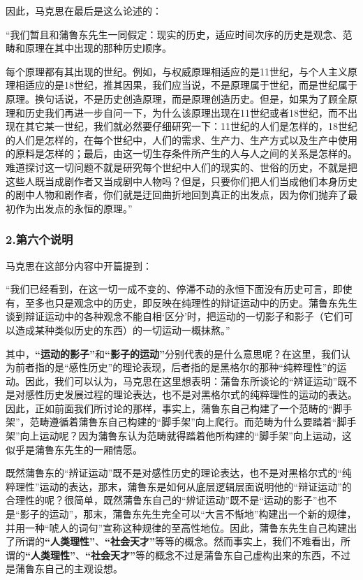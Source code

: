 \documentclass[a4paper,twoside,12pt,AutoFakeBold]{ctexart}
\begin{document}
因此，马克思在最后是这么论述的：
\begin{adjustwidth}{2em}{2em}
    \qquad\fangsong
“我们暂且和蒲鲁东先生一同假定：现实的历史，适应时间次序的历史是观念、范畴和原理在其中出现的那种历史顺序。

每个原理都有其出现的世纪。例如，与权威原理相适应的是11世纪，与个人主义原理相适应的是18世纪，推其因果，我们应当说，不是原理属于世纪，而是世纪属于原理。换句话说，不是历史创造原理，而是原理创造历史。但是，如果为了顾全原理和历史我们再进一步自问一下，为什么该原理出现在11世纪或者18世纪，而不出现在其它某一世纪，我们就必然要仔细研究一下：11世纪的人们是怎样的，18世纪的人们是怎样的，在每个世纪中，人们的需求、生产力、生产方式以及生产中使用的原料是怎样的；最后，由这一切生存条件所产生的人与人之间的关系是怎样的。难道探讨这一切问题不就是研究每个世纪中人们的现实的、世俗的历史，不就是把这些人既当成剧作者又当成剧中人物吗？但是，只要你们把人们当成他们本身历史的剧中人物和剧作者，你们就是迂回曲折地回到真正的出发点，因为你们抛弃了最初作为出发点的永恒的原理。”
\end{adjustwidth}

\subsubsection{2.第六个说明}
马克思在这部分内容中开篇提到：
\begin{adjustwidth}{2em}{2em}
    \qquad\fangsong
    “我们已经看到，在这一切一成不变的、停滞不动的永恒下面没有历史可言，即使有，至多也只是观念中的历史，即反映在纯理性的辩证运动中的历史。蒲鲁东先生谈到辩证运动中的各种观念不能自相‘区分’时，把运动的一切影子和影子（它们可以造成某种类似历史的东西）的一切运动一概抹熬。”
\end{adjustwidth}

其中，\textbf{“运动的影子”}和\textbf{“影子的运动”}分别代表的是什么意思呢？在这里，我们认为前者指的是“感性历史”的理论表现，后者指的是黑格尔的那种“纯粹理性”的运动。因此，我们可以认为，马克思在这里想表明：蒲鲁东所谈论的“辨证运动”既不是对感性历史发展过程的理论表达，也不是对黑格尔式的纯粹理性的运动的表达。因此，正如前面我们所讨论的那样，事实上，蒲鲁东自己构建了一个范畴的“脚手架”，范畴遵循着蒲鲁东自己构建的“脚手架”向上爬行。而范畴为什么要踏着“脚手架”向上运动呢？因为蒲鲁东认为范畴就得踏着他所构建的“脚手架”向上运动，这似乎是蒲鲁东先生的一厢情愿。

既然蒲鲁东的“辨证运动”既不是对感性历史的理论表达，也不是对黑格尔式的“纯粹理性”运动的表达，那末，蒲鲁东是如何从底层逻辑层面说明他的“辩证运动”的合理性的呢？很简单，既然蒲鲁东自己的“辨证运动”既不是“运动的影子”也不是“影子的运动”，那末，蒲鲁东先生完全可以“大言不惭地”构建出一个新的规律，并用一种“唬人的词句”宣称这种规律的至高性地位。因此，蒲鲁东先生自己构建出了所谓的\textbf{“人类理性”}、\textbf{“社会天才”}等等的概念。然而事实上，我们不难看出，所谓的\textbf{“人类理性”}、\textbf{“社会天才”}等的概念不过是蒲鲁东自己虚构出来的东西，不过是蒲鲁东自己的主观设想。
\end{document}
